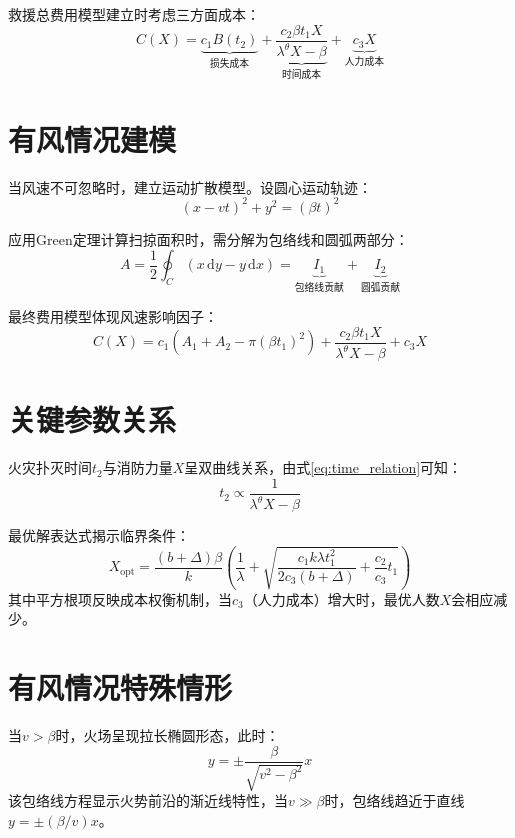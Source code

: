 救援总费用模型建立时考虑三方面成本：
\begin{equation}\label{eq:cost_model}
    C(X) = \underbrace{c_{1}B(t_2)}_{\text{损失成本}} + \underbrace{\frac{c_{2}\beta t_{1}X}{\lambda^{\theta}X - \beta}}_{\text{时间成本}} + \underbrace{c_{3}X}_{\text{人力成本}}
\end{equation}

\section*{有风情况建模}
当风速不可忽略时，建立运动扩散模型。设圆心运动轨迹：
\begin{equation}\label{eq:fire_center}
    (x - vt)^2 + y^2 = (\beta t)^2
\end{equation}

应用Green定理计算扫掠面积时，需分解为包络线和圆弧两部分：
\begin{equation}\label{eq:green_area}
    A = \frac{1}{2}\oint_{C} (x\,\mathrm{d}y - y\,\mathrm{d}x) = \underbrace{I_1}_{\text{包络线贡献}} + \underbrace{I_2}_{\text{圆弧贡献}}
\end{equation}

最终费用模型体现风速影响因子：
\begin{equation}\label{eq:wind_cost}
    C(X) = c_1(A_1 + A_2 - \pi (\beta t_1)^2) + \frac{c_2 \beta t_1 X}{\lambda^{\theta}X - \beta} + c_3 X
\end{equation}

\section*{关键参数关系}
火灾扑灭时间$t_2$与消防力量$X$呈双曲线关系，由式\eqref{eq:time_relation}可知：
\begin{equation}\label{eq:extinguish_time}
    t_2 \propto \frac{1}{\lambda^{\theta}X - \beta}
\end{equation}

最优解表达式揭示临界条件：
\begin{equation}\label{eq:optimal_condition}
    X_{\text{opt}} = \frac{(b+\Delta)\beta}{k} \left( \frac{1}{\lambda} + \sqrt{\frac{c_1 k \lambda t_1^2}{2c_3 (b+\Delta)} + \frac{c_2}{c_3}t_1} \right)
\end{equation}
其中平方根项反映成本权衡机制，当$c_3$（人力成本）增大时，最优人数$X$会相应减少。

\section*{有风情况特殊情形}
当$v > \beta$时，火场呈现拉长椭圆形态，此时：
\begin{equation}\label{eq:envelope_equation}
    y = \pm\frac{\beta}{\sqrt{v^2 - \beta^2}}x
\end{equation}
该包络线方程显示火势前沿的渐近线特性，当$v \gg \beta$时，包络线趋近于直线$y = \pm(\beta/v)x$。

